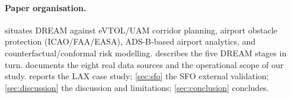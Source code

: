 \paragraph{Paper organisation.}
 situates DREAM against eVTOL/UAM corridor planning,
airport obstacle protection (ICAO/FAA/EASA), ADS-B-based airport analytics, and
counterfactual/conformal risk modelling.  describes the five
DREAM stages in turn.  documents the eight real data sources
and the operational scope of our study.  reports the LAX case
study; \cref{sec:sfo} the SFO external validation; \cref{sec:discussion} the
discussion and limitations; \cref{sec:conclusion} concludes.
